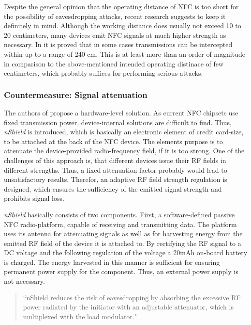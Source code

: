 \documentclass[12pt,a4paper]{article}
\begin{document}
Despite the general opinion that the operating distance of NFC is too short for the possibility of eavesdropping attacks, recent research suggests to keep it definitely in mind. Although the working distance does usually not exceed 10 to 20 centimeters, many devices emit NFC signals at much higher strength as necessary. In \cite{DBLP:conf/mobisys/ZhouX14} it is proved that in some cases transmissions can be intercepted within up to a range of 240 cm. This is at least more than an order of magnitude in comparison to the above-mentioned intended operating distinace of few centimeters, which probably suffices for performing serious attacks.

\subsubsection{Countermeasure: Signal attenuation}

The authors of \cite{DBLP:conf/mobisys/ZhouX14} propose a hardware-level solution. As current NFC chipsets use fixed transmission power, device-internal solutions are difficult to find. Thus, \emph{nShield} is introduced, which is basically an electronic element of credit card-size, to be attached at the back of the NFC device. The elements purpose is to attenuate the device-provided radio-frequency field, if it is too strong. One of the challenges of this approach is, that different devices issue their RF fields in different strengths. Thus, a fixed attenuation factor probably would lead to unsatisfactory results. Therefor, an adaptive RF field strength regulation is designed, which ensures the sufficiency of the emitted signal strength and prohibits signal loss.

\emph{nShield} basically consists of two components. First, a software-defined passive NFC radio-platform, capable of receiving and transmitting data. The platform uses its antenna for attenuating signals as well as for harvesting energy from the emitted RF field of the device it is attached to. By rectifying the RF signal to a DC voltage and the following regulation of the voltage a 20mAh on-board battery is charged. The energy harvested in this manner is sufficient for ensuring permanent power supply for the component. Thus, an external power supply is not necessary.

\begin{quote}
``nShield reduces the risk of eavesdropping by absorbing the excessive RF power radiated by the initiator with an adjustable attenuator, which is multiplexed with the load modulator."\cite{DBLP:conf/mobisys/ZhouX14}
\end{quote}
\end{document}
